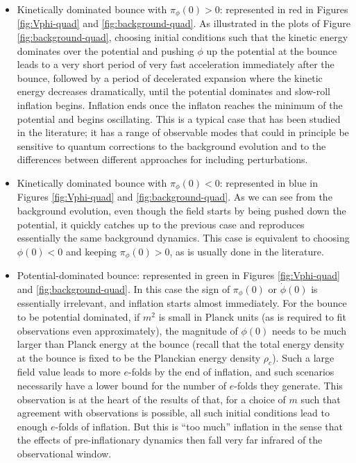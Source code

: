 \documentclass[aps,prd,11pt,showkeys,nofootinbib]{revtex4-2}
\begin{document}
\begin{itemize}
\item Kinetically dominated bounce with $\pi_\phi(0)>0$: represented in red in Figures \ref{fig:Vphi-quad} and \ref{fig:background-quad}. As illustrated in the plots of Figure \ref{fig:background-quad}, choosing initial conditions such that the kinetic energy dominates over the potential and pushing $\phi$ up the potential at the bounce leads to a very short period of very fast acceleration immediately after the bounce, followed by a period of decelerated expansion where the kinetic energy decreases dramatically, until the potential dominates and slow-roll inflation begins. Inflation ends once the inflaton reaches the minimum of the potential and begins oscillating. This is a typical case that has been studied in the literature; it has a range of observable modes that could in principle be sensitive to quantum corrections to the background evolution and to the differences between different approaches for including perturbations.
\item Kinetically dominated bounce with $\pi_\phi(0) <0$: represented in blue in Figures \ref{fig:Vphi-quad} and \ref{fig:background-quad}. As we can see from the background evolution, even though the field starts by being pushed down the potential, it quickly catches up to the previous case and reproduces essentially the same background dynamics. This case is equivalent to choosing $\phi(0) < 0$ and keeping $\pi_\phi (0) > 0$, as is usually done in the literature.
\item Potential-dominated bounce: represented in green in Figures \ref{fig:Vphi-quad} and \ref{fig:background-quad}. In this case the sign of $\pi_\phi(0)$ or $\dot\phi(0)$ is essentially irrelevant, and inflation starts almost immediately. For the bounce to be potential dominated, if $m^2$ is small in Planck units (as is required to fit observations even approximately), the magnitude of $\phi(0)$ needs to be much larger than Planck energy at the bounce (recall that the total energy density at the bounce is fixed to be the Planckian energy density $\rho_c$). Such a large field value leads to more $e$-folds by the end of inflation, and such scenarios necessarily have a lower bound for the number of $e$-folds they generate. This observation is at the heart of the results of \cite{Ashtekar:2009mm,Ashtekar:2011rm} that, for a choice of $m$ such that agreement with observations is possible, all such initial conditions lead to enough $e$-folds of inflation. But this is ``too much'' inflation in the sense that the effects of pre-inflationary dynamics then fall very far infrared of the observational window.
\end{itemize}
\end{document}
